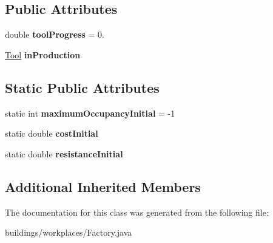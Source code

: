 \subsection*{Public Attributes}
\begin{DoxyCompactItemize}
\item 
double {\bfseries tool\+Progress} = 0.\hypertarget{classbuildings_1_1workplaces_1_1_factory_ae08b23918cdb2ed06db65bdbc635b0c9}{}\label{classbuildings_1_1workplaces_1_1_factory_ae08b23918cdb2ed06db65bdbc635b0c9}

\item 
\hyperlink{classtools_1_1_tool}{Tool} {\bfseries in\+Production}\hypertarget{classbuildings_1_1workplaces_1_1_factory_ac2d5c9699966d7c8302207b77dac2e44}{}\label{classbuildings_1_1workplaces_1_1_factory_ac2d5c9699966d7c8302207b77dac2e44}

\end{DoxyCompactItemize}
\subsection*{Static Public Attributes}
\begin{DoxyCompactItemize}
\item 
static int {\bfseries maximum\+Occupancy\+Initial} = -\/1\hypertarget{classbuildings_1_1workplaces_1_1_factory_ae34c7eac6d94959017298643f1705076}{}\label{classbuildings_1_1workplaces_1_1_factory_ae34c7eac6d94959017298643f1705076}

\item 
static double {\bfseries cost\+Initial}\hypertarget{classbuildings_1_1workplaces_1_1_factory_ac7d9dcf8f2a59ac74d49b94a28a4aefe}{}\label{classbuildings_1_1workplaces_1_1_factory_ac7d9dcf8f2a59ac74d49b94a28a4aefe}

\item 
static double {\bfseries resistance\+Initial}\hypertarget{classbuildings_1_1workplaces_1_1_factory_a192c1616aad39f02149b60283b8e9d10}{}\label{classbuildings_1_1workplaces_1_1_factory_a192c1616aad39f02149b60283b8e9d10}

\end{DoxyCompactItemize}
\subsection*{Additional Inherited Members}


The documentation for this class was generated from the following file\+:\begin{DoxyCompactItemize}
\item 
buildings/workplaces/Factory.\+java\end{DoxyCompactItemize}
